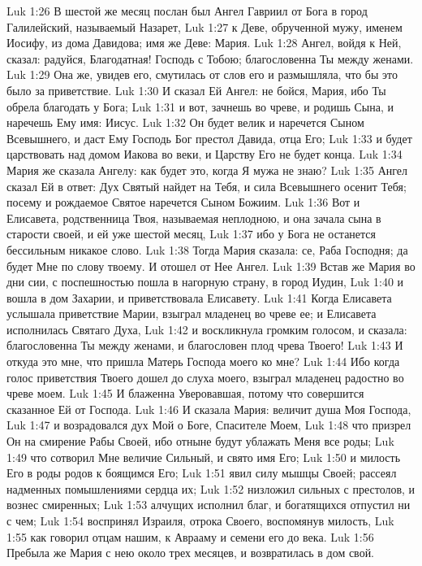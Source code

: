 Luk 1:26  В шестой же месяц послан был Ангел Гавриил от Бога в город Галилейский, называемый Назарет,
Luk 1:27  к Деве, обрученной мужу, именем Иосифу, из дома Давидова; имя же Деве: Мария.
Luk 1:28  Ангел, войдя к Ней, сказал: радуйся, Благодатная! Господь с Тобою; благословенна Ты между женами.
Luk 1:29  Она же, увидев его, смутилась от слов его и размышляла, что бы это было за приветствие.
Luk 1:30  И сказал Ей Ангел: не бойся, Мария, ибо Ты обрела благодать у Бога;
Luk 1:31  и вот, зачнешь во чреве, и родишь Сына, и наречешь Ему имя: Иисус.
Luk 1:32  Он будет велик и наречется Сыном Всевышнего, и даст Ему Господь Бог престол Давида, отца Его;
Luk 1:33  и будет царствовать над домом Иакова во веки, и Царству Его не будет конца.
Luk 1:34  Мария же сказала Ангелу: как будет это, когда Я мужа не знаю?
Luk 1:35  Ангел сказал Ей в ответ: Дух Святый найдет на Тебя, и сила Всевышнего осенит Тебя; посему и рождаемое Святое наречется Сыном Божиим.
Luk 1:36  Вот и Елисавета, родственница Твоя, называемая неплодною, и она зачала сына в старости своей, и ей уже шестой месяц,
Luk 1:37  ибо у Бога не останется бессильным никакое слово.
Luk 1:38  Тогда Мария сказала: се, Раба Господня; да будет Мне по слову твоему. И отошел от Нее Ангел.
Luk 1:39  Встав же Мария во дни сии, с поспешностью пошла в нагорную страну, в город Иудин,
Luk 1:40  и вошла в дом Захарии, и приветствовала Елисавету.
Luk 1:41  Когда Елисавета услышала приветствие Марии, взыграл младенец во чреве ее; и Елисавета исполнилась Святаго Духа,
Luk 1:42  и воскликнула громким голосом, и сказала: благословенна Ты между женами, и благословен плод чрева Твоего!
Luk 1:43  И откуда это мне, что пришла Матерь Господа моего ко мне?
Luk 1:44  Ибо когда голос приветствия Твоего дошел до слуха моего, взыграл младенец радостно во чреве моем.
Luk 1:45  И блаженна Уверовавшая, потому что совершится сказанное Ей от Господа.
Luk 1:46  И сказала Мария: величит душа Моя Господа,
Luk 1:47  и возрадовался дух Мой о Боге, Спасителе Моем,
Luk 1:48  что призрел Он на смирение Рабы Своей, ибо отныне будут ублажать Меня все роды;
Luk 1:49  что сотворил Мне величие Сильный, и свято имя Его;
Luk 1:50  и милость Его в роды родов к боящимся Его;
Luk 1:51  явил силу мышцы Своей; рассеял надменных помышлениями сердца их;
Luk 1:52  низложил сильных с престолов, и вознес смиренных;
Luk 1:53  алчущих исполнил благ, и богатящихся отпустил ни с чем;
Luk 1:54  воспринял Израиля, отрока Своего, воспомянув милость,
Luk 1:55  как говорил отцам нашим, к Аврааму и семени его до века.
Luk 1:56  Пребыла же Мария с нею около трех месяцев, и возвратилась в дом свой.
